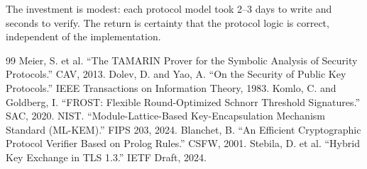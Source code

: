 \documentclass[11pt,a4paper]{article}
\begin{document}
The investment is modest: each protocol model took 2--3 days to write and seconds to
verify. The return is certainty that the protocol logic is correct, independent of the
implementation.

\begin{thebibliography}{99}
 Meier, S. et al. ``The TAMARIN Prover for the Symbolic Analysis of Security Protocols.'' CAV, 2013.
 Dolev, D. and Yao, A. ``On the Security of Public Key Protocols.'' IEEE Transactions on Information Theory, 1983.
 Komlo, C. and Goldberg, I. ``FROST: Flexible Round-Optimized Schnorr Threshold Signatures.'' SAC, 2020.
 NIST. ``Module-Lattice-Based Key-Encapsulation Mechanism Standard (ML-KEM).'' FIPS 203, 2024.
 Blanchet, B. ``An Efficient Cryptographic Protocol Verifier Based on Prolog Rules.'' CSFW, 2001.
 Stebila, D. et al. ``Hybrid Key Exchange in TLS 1.3.'' IETF Draft, 2024.
\end{thebibliography}
\end{document}
